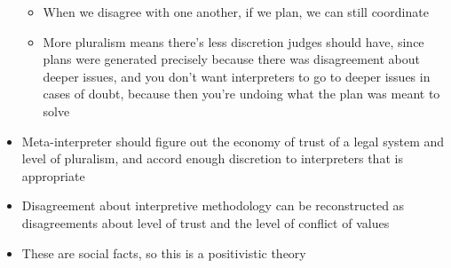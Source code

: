 \begin{itemize}
  \begin{itemize}
  \tightlist
  \item
    When we disagree with one another, if we plan, we can still
    coordinate
  \item
    More pluralism means there's less discretion judges should have,
    since plans were generated precisely because there was disagreement
    about deeper issues, and you don't want interpreters to go to deeper
    issues in cases of doubt, because then you're undoing what the plan
    was meant to solve
  \end{itemize}
\item
  Meta-interpreter should figure out the economy of trust of a legal
  system and level of pluralism, and accord enough discretion to
  interpreters that is appropriate
\item
  Disagreement about interpretive methodology can be reconstructed as
  disagreements about level of trust and the level of conflict of values
\item
  These are social facts, so this is a positivistic theory
\end{itemize}
